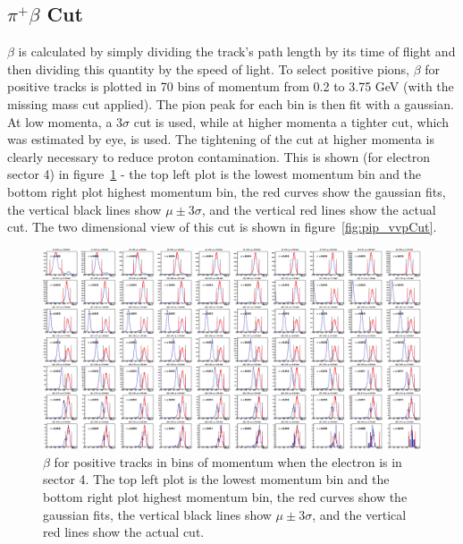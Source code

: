 \subsection{$\pi^+ \beta$ Cut}
$\beta$ is calculated by simply dividing the track's path length by its time of flight and then dividing this quantity by the speed of light.
To select positive pions, $\beta$ for positive tracks is plotted in 70 bins of momentum from 0.2 to 3.75 GeV (with the missing mass cut applied).
The pion peak for each bin is then fit with a gaussian.
At low momenta, a $3\sigma$ cut is used, while at higher momenta a tighter cut, which was estimated by eye, is used.
The tightening of the cut at higher momenta is clearly necessary to reduce proton contamination.
This is shown (for electron sector 4) in figure~\ref{fig:pos_1Dbeta_pBins} - the top left plot is the lowest momentum bin and the bottom right plot highest momentum bin, the red curves show the gaussian fits, the vertical black lines show $\mu \pm 3\sigma$, and the vertical red lines show the actual cut.
The two dimensional view of this cut is shown in figure~\ref{fig:pip_vvpCut}.
%
\begin{figure}
\centering
\includegraphics[width=8.5in]{figures/pos_1Dbeta_pBins.png}
\caption{$\beta$ for positive tracks in bins of momentum when the electron is in sector 4. The top left plot is the lowest momentum bin and the bottom right plot highest momentum bin, the red curves show the gaussian fits, the vertical black lines show $\mu \pm 3\sigma$, and the vertical red lines show the actual cut.}
\label{fig:pos_1Dbeta_pBins}
\end{figure}
%
